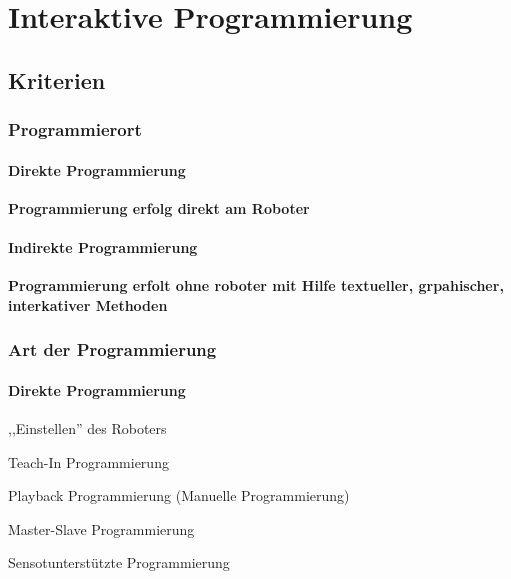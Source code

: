 \chapter{Interaktive Programmierung}

\section{Kriterien}

\subsection{Programmierort}
\subsubsection{Direkte Programmierung}
\textbf{Programmierung erfolg direkt am Roboter}
\subsubsection{Indirekte Programmierung}
\textbf{Programmierung erfolt ohne roboter mit Hilfe textueller, grpahischer, interkativer Methoden}
\subsection{Art der Programmierung}
\subsubsection{Direkte Programmierung}
\begin{compactitem}
    \item ,,Einstellen'' des Roboters
    \item Teach-In Programmierung
    \item Playback Programmierung (Manuelle Programmierung)
    \item Master-Slave Programmierung
    \item Sensotunterstützte Programmierung
\end{compactitem}
